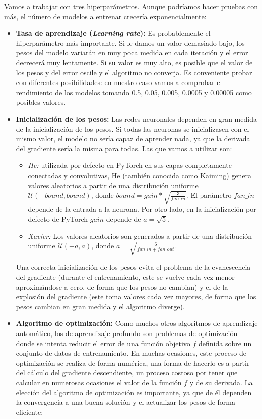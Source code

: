 Vamos a trabajar con tres hiperparámetros. Aunque podríamos hacer pruebas con más, el número de modelos a entrenar crecería exponencialmente:
\begin{itemize}
    \item \textbf{Tasa de aprendizaje (\textit{Learning rate}):} Es probablemente el hiperparámetro más importante. Si le damos un valor demasiado bajo, los pesos del modelo variarán en muy poca medida en cada iteración y el error decrecerá muy lentamente. Si su valor es muy alto, es posible que el valor de los pesos y del error oscile y el algoritmo no converja. Es conveniente probar con diferentes posibilidades: en nuestro caso vamos a comprobar el rendimiento de los modelos tomando 0.5, 0.05, 0.005, 0.0005 y 0.00005 como posibles valores. \cite{berzal2018redes}
    \item \textbf{Inicialización de los pesos:} Las redes neuronales dependen en gran medida de la inicialización de los pesos. Si todas las neuronas se inicializasen con el mismo valor, el modelo no sería capaz de aprender nada, ya que la derivada del gradiente sería la misma para todas. Las que vamos a utilizar son: \cite{pytorch-doc}
    \begin{itemize}
        \item \textit{He:} utilizada por defecto en PyTorch en sus capas completamente conectadas y convolutivas, He (también conocida como Kaiming) genera valores aleatorios a partir de una distribución uniforme $\mathcal{U}(-bound, bound)$, donde $bound = gain * \sqrt{\frac{3}{fan\_in}}$. El parámetro $fan\_in$ depende de la entrada a la neurona. Por otro lado, en la inicialización por defecto de PyTorch $gain$ depende de $a = \sqrt{5}$.
        \item \textit{Xavier:} Los valores aleatorios son generados a partir de una distribución uniforme $\mathcal{U}(-a, a)$, donde $a = \sqrt{\frac{6}{fan\_in + fan\_out}}$. 
    \end{itemize}
    Una correcta inicialización de los pesos evita el problema de la evanescencia del gradiente (durante el entrenamiento, este se vuelve cada vez menor aproximándose a cero, de forma que los pesos no cambian) y el de la explosión del gradiente (este toma valores cada vez mayores, de forma que los pesos cambian en gran medida y el algoritmo diverge).
    \item \textbf{Algoritmo de optimización:} Como muchos otros algoritmos de aprendizaje automático, los de aprendizaje profundo son problemas de optimización donde se intenta reducir el error de una función objetivo $f$ definida sobre un conjunto de datos de entrenamiento. En muchas ocasiones, este proceso de optimización se realiza de forma numérica, una forma de hacerlo es a partir del cálculo del gradiente descendiente, un proceso costoso por tener que calcular en numerosas ocasiones el valor de la función $f$ y de su derivada. La elección del algoritmo de optimización es importante, ya que de él dependen la convergencia a una buena solución y el actualizar los pesos de forma eficiente: \cite{berzal2018redes}

\end{itemize}

